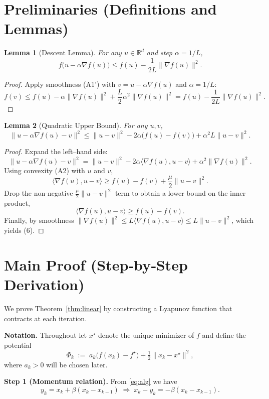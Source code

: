 \documentclass{article}
\newtheorem{lemma}{Lemma}
\begin{document}
\section*{Preliminaries (Definitions and Lemmas)}
\begin{lemma}[Descent Lemma]\label{lem:descent}
For any $u\in\mathbb{R}^{d}$ and step $\alpha=1/L$,
\[
f\bigl(u-\alpha\nabla f(u)\bigr)\le f(u)-\frac{1}{2L}\|\nabla f(u)\|^{2}.
\tag{5}
\]
\end{lemma}
\begin{proof}
Apply smoothness (A1') with $v=u-\alpha\nabla f(u)$ and $\alpha=1/L$:
\[
f(v)\le f(u)-\alpha\|\nabla f(u)\|^{2}
+\frac{L}{2}\alpha^{2}\|\nabla f(u)\|^{2}
= f(u)-\frac{1}{2L}\|\nabla f(u)\|^{2}.
\]
\end{proof}
\begin{lemma}[Quadratic Upper Bound]\label{lem:quad}
For any $u,v$,
\[
\|u-\alpha\nabla f(u)-v\|^{2}
\le \|u-v\|^{2}
-2\alpha\bigl(f(u)-f(v)\bigr)
+ \alpha^{2}L\|u-v\|^{2}.
\tag{6}
\]
\end{lemma}
\begin{proof}
Expand the left–hand side:
\[
\|u-\alpha\nabla f(u)-v\|^{2}
= \|u-v\|^{2}
-2\alpha\langle\nabla f(u),u-v\rangle
+\alpha^{2}\|\nabla f(u)\|^{2}.
\]
Using convexity (A2) with $u$ and $v$,
\[
\langle\nabla f(u),u-v\rangle\ge f(u)-f(v)+\frac{\mu}{2}\|u-v\|^{2}.
\]
Drop the non‑negative $\frac{\mu}{2}\|u-v\|^{2}$ term to obtain a lower bound on the inner product,
\[
\langle\nabla f(u),u-v\rangle\ge f(u)-f(v).
\]
Finally, by smoothness $\|\nabla f(u)\|^{2}\le L\langle\nabla f(u),u-v\rangle\le L\|u-v\|^{2}$, which yields (6).
\end{proof}

\section*{Main Proof (Step‑by‑Step Derivation)}
We prove Theorem~\ref{thm:linear} by constructing a Lyapunov function that contracts at each iteration.

\bigskip
\noindent\textbf{Notation.} Throughout let $x^{\star}$ denote the unique minimizer of $f$ and define the potential
\[
\Phi_{k}\;:=\; a_{k}\bigl(f(x_{k})-f^{\star}\bigr)+\tfrac12\|x_{k}-x^{\star}\|^{2},
\tag{7}
\]
where $a_{k}>0$ will be chosen later.

\bigskip
\noindent\textbf{Step 1 (Momentum relation).} From \eqref{eq:alg} we have
\[
y_{k}=x_{k}+ \beta (x_{k}-x_{k-1})
\;\Longrightarrow\;
x_{k}-y_{k}= -\beta (x_{k}-x_{k-1}). \tag{8}
\]
\end{document}
